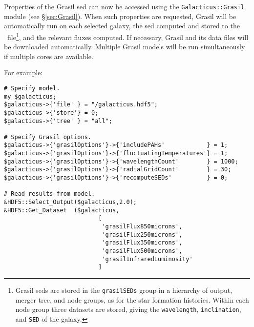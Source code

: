 Properties of the {\sc Grasil} \gls{sed} can now be accessed using the {\tt Galacticus::Grasil} module (see \S\ref{sec:Grasil}). When such properties are requested, {\sc Grasil} will be automatically run on each selected galaxy, the \gls{sed} computed and stored to the \glc\ file\footnote{{\sc Grasil} \glspl{sed} are stored in the {\tt grasilSEDs} group in a hierarchy of output, merger tree, and node groups, as for the star formation histories. Within each node group three datasets are stored, giving the {\tt wavelength}, {\tt inclination}, and {\tt SED} of the galaxy.}, and the relevant fluxes computed. If necessary, {\sc Grasil} and its data files will be downloaded automatically. Multiple {\sc Grasil} models will be run simultaneously if multiple cores are available.

For example:
\begin{verbatim}
# Specify model.                                                                                                                 
my $galacticus;
$galacticus->{'file' } = "/galacticus.hdf5";
$galacticus->{'store'} = 0;
$galacticus->{'tree' } = "all";

# Specify Grasil options.                                                                                                        
$galacticus->{'grasilOptions'}->{'includePAHs'            } = 1;
$galacticus->{'grasilOptions'}->{'fluctuatingTemperatures'} = 1;
$galacticus->{'grasilOptions'}->{'wavelengthCount'        } = 1000;
$galacticus->{'grasilOptions'}->{'radialGridCount'        } = 30;
$galacticus->{'grasilOptions'}->{'recomputeSEDs'          } = 0;

# Read results from model.                                                                                                       
&HDF5::Select_Output($galacticus,2.0);
&HDF5::Get_Dataset  ($galacticus,
                           [
                            'grasilFlux850microns',
                            'grasilFlux250microns',
                            'grasilFlux350microns',
                            'grasilFlux500microns',
                            'grasilInfraredLuminosity'
                           ]
\end{verbatim}
